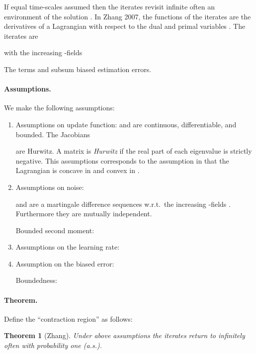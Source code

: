 \documentclass{article}
\newtheorem{theorem}{Theorem}
\begin{document}
If equal time-scales assumed then the iterates revisit infinite often
an environment of the solution \cite{Zhang:07}.
In Zhang 2007, the functions of the
iterates are the derivatives of a Lagrangian with respect to the dual
and primal variables \cite{Zhang:07}.
The iterates are

with the increasing -fields

The terms  and  subsum biased estimation
errors.



\paragraph{Assumptions.}
We make the following assumptions:
\begin{enumerate}[label=\textbf{(A\arabic*)}]
\item Assumptions on update function:
 and  are continuous, differentiable, and bounded.
The Jacobians

are Hurwitz.
A matrix is {\em Hurwitz} if the real part of each eigenvalue is strictly
negative.
This assumptions corresponds to the assumption in \cite{Zhang:07}
that the Lagrangian is concave in  and convex in .


\item Assumptions on noise:

 and 
are a martingale difference sequences
w.r.t.\ the increasing -fields .
Furthermore they are mutually independent.

Bounded second moment:


\item Assumptions on the learning rate:


\item Assumption on the biased error:

Boundedness:


\end{enumerate}


\paragraph{Theorem.}

Define the ``contraction region''  as follows:


\begin{theorem}[Zhang]
\label{th:Zhang}
Under above assumptions the iterates return to 
infinitely often with probability one (a.s.).
\end{theorem}
\end{document}
